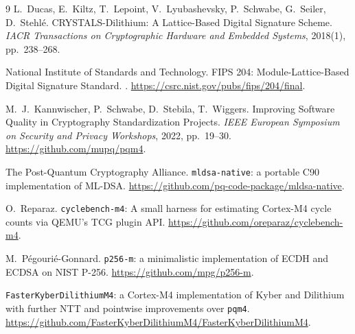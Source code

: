 \documentclass[11pt,a4paper]{article}
\begin{document}
\begin{thebibliography}{9}
L.~Ducas, E.~Kiltz, T.~Lepoint, V.~Lyubashevsky, P.~Schwabe, G.~Seiler,
D.~Stehl\'e.
\newblock CRYSTALS-Dilithium: A Lattice-Based Digital Signature Scheme.
\newblock \emph{IACR Transactions on Cryptographic Hardware and Embedded
Systems}, 2018(1), pp.~238--268.

National Institute of Standards and Technology.
\newblock FIPS 204: Module-Lattice-Based Digital Signature Standard.
. \url{https://csrc.nist.gov/pubs/fips/204/final}.

M.~J.~Kannwischer, P.~Schwabe, D.~Stebila, T.~Wiggers.
\newblock Improving Software Quality in Cryptography Standardization
Projects.
\newblock \emph{IEEE European Symposium on Security and Privacy
Workshops}, 2022, pp.~19--30.
\newblock \url{https://github.com/mupq/pqm4}.

The Post-Quantum Cryptography Alliance.
\newblock \texttt{mldsa-native}: a portable C90 implementation of
ML-DSA.
\newblock \url{https://github.com/pq-code-package/mldsa-native}.

O.~Reparaz.
\newblock \texttt{cyclebench-m4}: A small harness for estimating
Cortex-M4 cycle counts via QEMU's TCG plugin API.
\newblock \url{https://github.com/oreparaz/cyclebench-m4}.

M.~P\'egouri\'e-Gonnard.
\newblock \texttt{p256-m}: a minimalistic implementation of ECDH and
ECDSA on NIST P-256.
\newblock \url{https://github.com/mpg/p256-m}.

\texttt{FasterKyberDilithiumM4}: a Cortex-M4 implementation of Kyber
and Dilithium with further NTT and pointwise improvements over
\texttt{pqm4}.
\newblock \url{https://github.com/FasterKyberDilithiumM4/FasterKyberDilithiumM4}.

\end{thebibliography}
\end{document}
